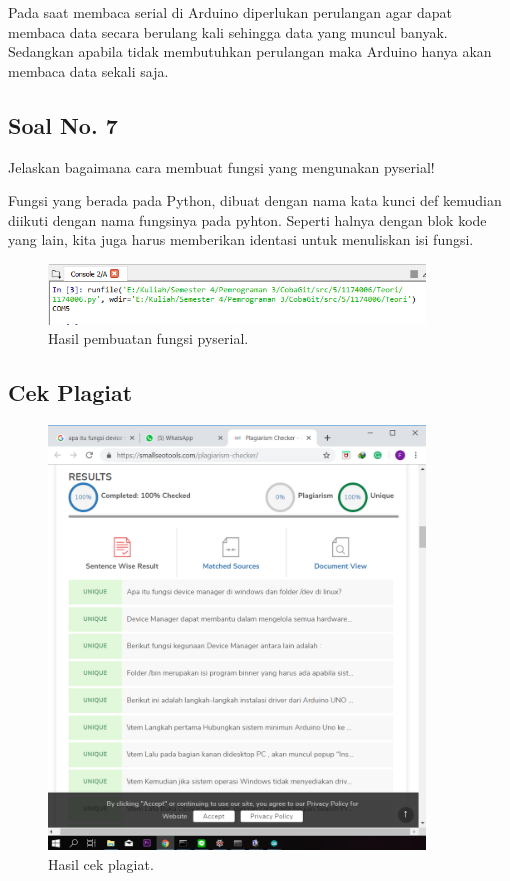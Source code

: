 \hfill \break
Pada saat membaca serial di Arduino diperlukan perulangan agar dapat membaca data secara berulang kali sehingga data yang muncul banyak. Sedangkan apabila tidak membutuhkan perulangan maka Arduino hanya akan membaca data sekali saja.

\subsection{Soal No. 7}
Jelaskan bagaimana cara membuat fungsi yang mengunakan pyserial!

\hfill \break
Fungsi yang berada pada Python, dibuat dengan nama kata kunci def kemudian diikuti dengan nama fungsinya pada pyhton.
Seperti halnya dengan blok kode yang lain, kita juga harus memberikan identasi untuk menuliskan isi fungsi.



\begin{figure}[H]
	\includegraphics[width=10cm]{figures/5/1174026/Teori/hasil.png}
	\centering
	\caption{Hasil pembuatan fungsi pyserial.}
\end{figure}

\subsection{Cek Plagiat}
\begin{figure}[H]
	\includegraphics[width=10cm]{figures/5/1174026/Teori/Plagiat.png}
	\centering
	\caption{Hasil cek plagiat.}
\end{figure}



